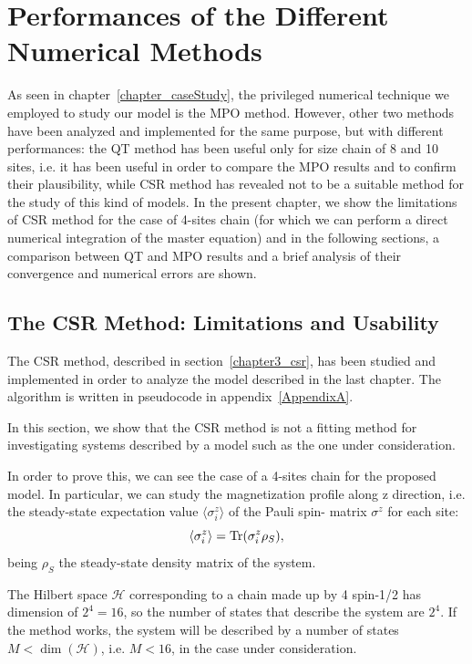 \chapter{Performances of the Different Numerical Methods}
\label{chapterPerformances}
As seen in chapter~\ref{chapter_caseStudy}, the privileged numerical technique we employed to study our model is the MPO method. However, other two methods have been analyzed and implemented for the same purpose, but with different performances: the QT method has been useful only for size chain of 8 and 10 sites, i.e. it has been useful in order to compare the MPO results and to confirm their plausibility, while CSR method has revealed not to be a suitable method for the study of this kind of models. In the present chapter, we show the limitations of CSR method for the case of 4-sites chain (for which we can perform a direct numerical integration of the master equation) and in the following sections, a comparison between QT and MPO results and a brief analysis of their convergence and numerical errors are shown.

\section{The CSR Method: Limitations and Usability}
The CSR method, described in section~\ref{chapter3_csr}, has been studied and implemented in order to analyze the model described in the last chapter. The algorithm is written in pseudocode in appendix~\ref{AppendixA}.

In this section, we show that the CSR method is not a fitting method for investigating systems described by a model such as the one under consideration.

In order to prove this, we can see the case of a 4-sites chain for the proposed model. In particular, we can study the magnetization profile along z direction, i.e. the steady-state expectation value $\langle \sigma_i^z \rangle$ of the Pauli spin- matrix $\sigma^z$ for each site:
\begin{equation*}
    \langle \sigma_i^z \rangle = \operatorname{Tr}(\sigma_i^z \rho_S),
\end{equation*}
being $\rho_S$ the steady-state density matrix of the system.

The Hilbert space $\mathcal{H}$ corresponding to a chain made up by 4 spin-1/2 has dimension of $2^{4} = 16$, so the number of states that describe the system are $2^4$. If the method works, the system will be described by a number of states $M < \dim(\mathcal{H})$, i.e. $M < 16$, in the case under consideration.

